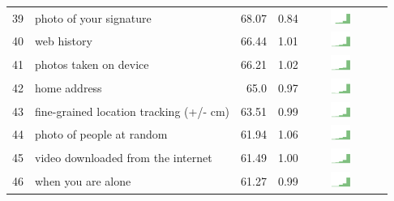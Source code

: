 \begin{table}[t]
\begin{center}
\begin{tabular}{| r | l | r | r | r | r |}
39 & photo of your signature & 68.07 & 0.84 & \includegraphics[width = 2cm, height = 0.5cm]{tex-inputs/table-images/tookapictureofyoursignaturecombined} \\ 
40 & web history & 66.44 & 1.01 & \includegraphics[width = 2cm, height = 0.5cm]{tex-inputs/table-images/learnedwhatwebsitesyougotocombined} \\ 
41 & photos taken on device & 66.21 & 1.02 & \includegraphics[width = 2cm, height = 0.5cm]{tex-inputs/table-images/sharedphotosyoutookwhicharealreadyonyourdevicecombined} \\ 
42 & home address & 65.0 & 0.97 & \includegraphics[width = 2cm, height = 0.5cm]{tex-inputs/table-images/learnedwhereyoulivesomehowcombined} \\ 
43 & fine-grained location tracking (+/- cm) & 63.51 & 0.99 & \includegraphics[width = 2cm, height = 0.5cm]{tex-inputs/table-images/trackedwhereyouareveryaccurately(whereyouareinaroom)combined} \\ 
44 & photo of people at random & 61.94 & 1.06 & \includegraphics[width = 2cm, height = 0.5cm]{tex-inputs/table-images/tookphotosofpeople(withanoutward-facingcamera)atrandomcombined} \\ 
45 & video downloaded from the internet & 61.49 & 1.00 & \includegraphics[width = 2cm, height = 0.5cm]{tex-inputs/table-images/sharedvideosyoudownloadedontheinternetsavedonyourdevicecombined} \\ 
46 & when you are alone & 61.27 & 0.99 & \includegraphics[width = 2cm, height = 0.5cm]{tex-inputs/table-images/learnedwhenandhowmuchyouspendtimealonecombined} \\ 

\end{tabular}
\end{center}
\end{table}
